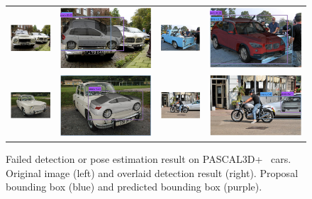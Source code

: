 \documentclass[10pt,twocolumn,letterpaper]{article}
\begin{document}
\begin{figure}[h]
\begin{tabular}{|cc|cc|}
  \includegraphics[width=0.22\linewidth]{supp/pas_car14a.png} &
  \includegraphics[width=0.22\linewidth]{supp/pas_car14b.png} & 
  \includegraphics[width=0.22\linewidth]{supp/pas_car15a.png} &
  \includegraphics[width=0.22\linewidth]{supp/pas_car15.png} \\ 
  \includegraphics[width=0.22\linewidth]{supp/pas_car20a.png} &
  \includegraphics[width=0.22\linewidth]{supp/pas_car20b.png} &
  \includegraphics[width=0.22\linewidth]{supp/pas_car23a.png} &
  \includegraphics[width=0.22\linewidth]{supp/pas_car23b.png} \\
  \hline
  \end{tabular}
\caption{Failed detection or pose estimation result on
  PASCAL3D+~\cite{Xiang14} cars. Original image (left) and
  overlaid detection result (right). Proposal bounding box (blue) and
  predicted bounding box (purple).} 
  \label{fig:pascal3d_car_bad}
\end{figure}
\end{document}

